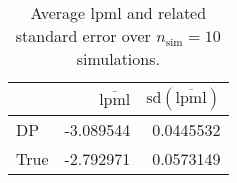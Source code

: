 \begin{table}[H]

\caption{Average lpml and related standard error over $n_{\text{sim}} = 10$ simulations.}
\centering
\begin{tabular}[t]{lrr}
\toprule
  & $\overbar{\text{lpml}}$ & $\text{sd}(\overbar{\text{lpml}})$\\
\midrule
DP & -3.089544 & 0.0445532\\
True & -2.792971 & 0.0573149\\
\bottomrule
\end{tabular}
\end{table}